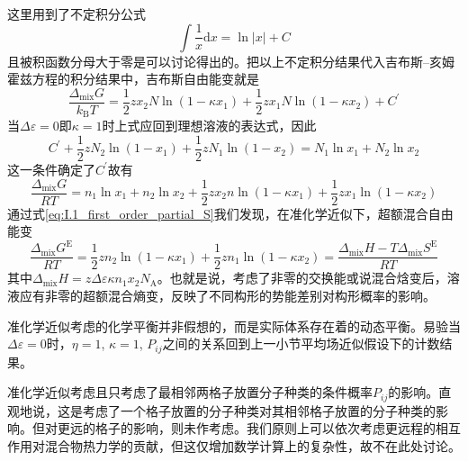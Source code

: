 \documentclass[main.tex]{subfiles}
\begin{document}
这里用到了不定积分公式
\[\int\frac{1}{x}\mathrm{d}x=\ln\left|x\right|+C\]
且被积函数分母大于零是可以讨论得出的。把以上不定积分结果代入吉布斯--亥姆霍兹方程的积分结果中，吉布斯自由能变就是
\[\frac{\Delta_\text{mix}G}{k_\text{B}T}=\frac{1}{2}zx_2N\ln\left(1-\kappa x_1\right)+\frac{1}{2}zx_1N\ln\left(1-\kappa x_2\right)+C^\prime\]
当$\Delta\varepsilon=0$即$\kappa=1$时上式应回到理想溶液的表达式，因此
\[C^\prime+\frac{1}{2}zN_2\ln\left(1-x_1\right)+\frac{1}{2}zN_1\ln\left(1-x_2\right)=N_1\ln x_1+N_2\ln x_2\]
这一条件确定了$C^\prime$故有
\begin{equation}
  \frac{\Delta_\text{mix}G}{RT}=n_1\ln x_1+n_2\ln x_2+\frac{1}{2}zx_2n\ln\left(1-\kappa x_1\right)+\frac{1}{2}zx_1\ln\left(1-\kappa x_2\right)
\end{equation}
通过式\eqref{eq:I.1_first_order_partial_S}我们发现，在准化学近似下，超额混合自由能变
\[\frac{\Delta_\text{mix}G^\text{E}}{RT}=\frac{1}{2}zn_2\ln\left(1-\kappa x_1\right)+\frac{1}{2}zn_1\ln\left(1-\kappa x_2\right)=\frac{\Delta_\text{mix}H-T\Delta_\text{mix}S^\text{E}}{RT}\]
其中$\Delta_\text{mix}H=z\Delta\varepsilon\kappa n_1 x_2 N_\text{A}$。也就是说，考虑了非零的交换能或说混合焓变后，溶液应有非零的超额混合熵变，反映了不同构形的势能差别对构形概率的影响。

准化学近似考虑的化学平衡并非假想的，而是实际体系存在着的动态平衡。易验当$\Delta\varepsilon=0$时，$\eta=1$, $\kappa=1$, $P_{ij}$之间的关系回到上一小节平均场近似假设下的计数结果。

准化学近似考虑且只考虑了最相邻两格子放置分子种类的条件概率$P_{ij}$的影响。直观地说，这是考虑了一个格子放置的分子种类对其相邻格子放置的分子种类的影响。但对更远的格子的影响，则未作考虑。我们原则上可以依次考虑更远程的相互作用对混合物热力学的贡献，但这仅增加数学计算上的复杂性，故不在此处讨论。
\end{document}
